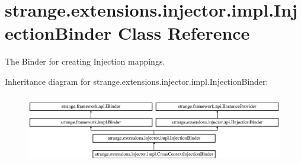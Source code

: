 \hypertarget{classstrange_1_1extensions_1_1injector_1_1impl_1_1_injection_binder}{\section{strange.\-extensions.\-injector.\-impl.\-Injection\-Binder Class Reference}
\label{classstrange_1_1extensions_1_1injector_1_1impl_1_1_injection_binder}
}


The Binder for creating Injection mappings.  


Inheritance diagram for strange.\-extensions.\-injector.\-impl.\-Injection\-Binder\-:\begin{figure}[H]
\begin{center}
\leavevmode
\includegraphics[height=3.111111cm]{classstrange_1_1extensions_1_1injector_1_1impl_1_1_injection_binder}
\end{center}
\end{figure}
